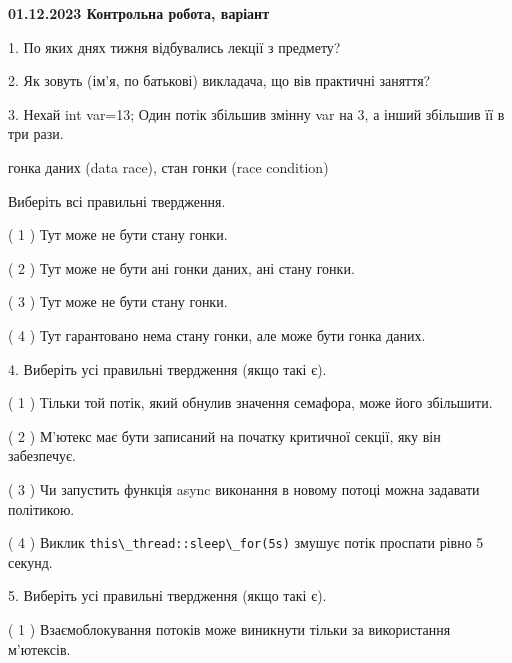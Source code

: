 \documentclass[12pt, ukrainian]{article}
\def\code#1{\Verb!#1!}
\begin{document}
\vspace{4mm}
\newpage
\begin {large}

\textbf{01.12.2023 Контрольна робота, варіант  }\par


{
1. По яких днях тижня відбувались лекції з предмету?



\vspace{5mm}
2. Як зовуть (ім'я, по батькові) викладача, що вів практичні заняття?



\vspace{5mm}
3. Нехай int var=13; Один потік збільшив змінну var на 3, а інший збільшив її в три рази.

гонка даних (data race), стан гонки (race condition)

Виберіть всі правильні твердження.\par
\vspace{2mm}
( 1 ) Тут може не бути стану гонки.%

( 2 ) Тут може не бути ані гонки даних, ані стану гонки.%

( 3 ) Тут може не бути стану гонки.%

( 4 ) Тут гарантовано нема стану гонки, але може бути гонка даних.%


\vspace{5mm}
4. Виберіть усі правильні твердження (якщо такі є).\par
\vspace{2mm}

( 1 ) Тільки той потік, який обнулив значення семафора, може його збільшити.%

( 2 ) М’ютекс має бути записаний на початку критичної секції, яку він забезпечує.%

( 3 ) Чи запустить функція  async виконання в новому потоці можна задавати політикою.%

( 4 ) Виклик \code{this\_thread::sleep\_for(5s)} змушує потік проспати рівно 5 секунд.%


\vspace{5mm}
5. Виберіть усі правильні твердження (якщо такі є).\par
\vspace{2mm}

( 1 ) Взаємоблокування потоків може виникнути тільки за використання м’ютексів.%

}
\end{large}
\end{document}
